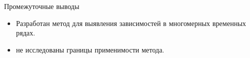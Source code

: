 \documentclass{beamer}
\begin{document}
	
	\begin{frame}{Промежуточные выводы}
		\begin{itemize}
			\item Разработан метод для выявления зависимостей в многомерных временных рядах.
			\item не исследованы границы применимости метода.
		\end{itemize}
	\end{frame}
	
\end{document}
